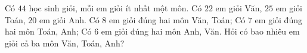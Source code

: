 \begin{vd}%
	Có $44$ học sinh giỏi, mỗi em giỏi ít nhất một môn. Có $22$ em giỏi Văn, $25$ em giỏi Toán, $20$ em giỏi Anh. Có $8$ em giỏi đúng hai môn Văn, Toán; Có $7$ em giỏi đúng hai môn Toán, Anh; Có $6$ em giỏi đúng hai môn Anh, Văn. Hỏi có bao nhiêu em giỏi cả ba môn Văn, Toán, Anh?
\end{vd}
